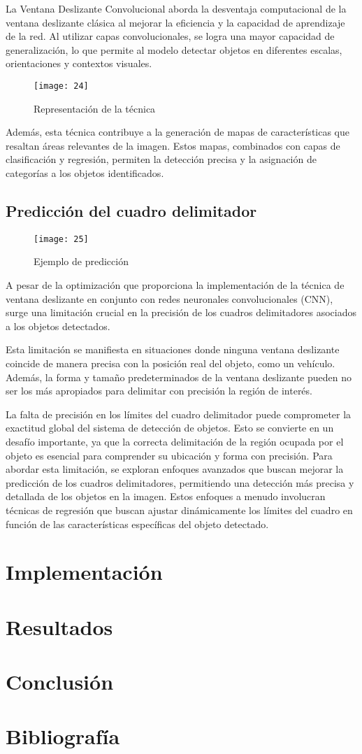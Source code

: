 	La Ventana Deslizante Convolucional aborda la desventaja computacional de la ventana deslizante clásica al mejorar la eficiencia y la capacidad de aprendizaje de la red. Al utilizar capas convolucionales, se logra una mayor capacidad de generalización, lo que permite al modelo detectar objetos en diferentes escalas, orientaciones y contextos visuales.
	
	\begin{figure}[ht]
	    \centering
		\texttt{[image: 24]}
		\caption{Representación de la técnica}
	\end{figure}
	
	Además, esta técnica contribuye a la generación de mapas de características que resaltan áreas relevantes de la imagen. Estos mapas, combinados con capas de clasificación y regresión, permiten la detección precisa y la asignación de categorías a los objetos identificados.

	\subsection{Predicción del cuadro delimitador}
	
	\begin{wrapfigure}[19]{R}{.43\textwidth} 
		\centering
		\texttt{[image: 25]}
		\caption{Ejemplo de predicción}
	\end{wrapfigure}
	
	A pesar de la optimización que proporciona la implementación de la técnica de ventana deslizante en conjunto con redes neuronales convolucionales (CNN), surge una limitación crucial en la precisión de los cuadros delimitadores asociados a los objetos detectados.

	Esta limitación se manifiesta en situaciones donde ninguna ventana deslizante coincide de manera precisa con la posición real del objeto, como un vehículo. Además, la forma y tamaño predeterminados de la ventana deslizante pueden no ser los más apropiados para delimitar con precisión la región de interés.
	
	La falta de precisión en los límites del cuadro delimitador puede comprometer la exactitud global del sistema de detección de objetos. Esto se convierte en un desafío importante, ya que la correcta delimitación de la región ocupada por el objeto es esencial para comprender su ubicación y forma con precisión.
	Para abordar esta limitación, se exploran enfoques avanzados que buscan mejorar la predicción de los cuadros delimitadores, permitiendo una detección más precisa y detallada de los objetos en la imagen. Estos enfoques a menudo involucran técnicas de regresión que buscan ajustar dinámicamente los límites del cuadro en función de las características específicas del objeto detectado.

	

\section{Implementación}
\section{Resultados}
\section{Conclusión}
\section{Bibliografía}
